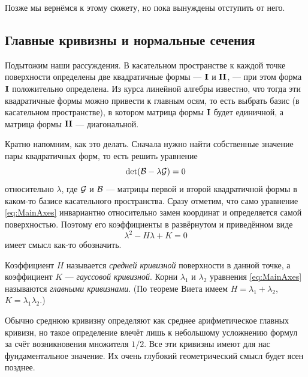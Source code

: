 \noindent%
Позже мы вернёмся к этому сюжету, но пока вынуждены отступить от него.

\subsection{Главные кривизны и нормальные сечения}

Подытожим наши рассуждения. В касательном пространстве к каждой точке поверхности определены две квадратичные формы --- $\boldsymbol{\operatorname{I}}$ и $\boldsymbol{\operatorname{II}}$, --- при этом форма $\boldsymbol{\operatorname{I}}$ положительно определена. Из курса линейной алгебры известно, что тогда эти квадратичные формы можно привести к главным осям, то есть выбрать базис (в касательном пространстве), в котором матрица формы $\boldsymbol{\operatorname{I}}$ будет единичной, а матрица формы $\boldsymbol{\operatorname{II}}$ --- диагональной.

Кратно напомним, как это делать. Сначала нужно найти собственные значение пары квадратичных форм\footnotemark{}, то есть решить уравнение
\begin{equation} \label{eq:MainAxes}
	\det(\mathcal{B} - \lambda\mathcal{G}) = 0
\end{equation}
относительно $\lambda$, где $\mathcal{G}$ и $\mathcal{B}$ --- матрицы первой и второй квадратичной формы в каком-то базисе касательного пространства. Сразу отметим, что само уравнение \eqref{eq:MainAxes} инвариантно относительно замен координат и определяется самой поверхностью. Поэтому его коэффициенты в развёрнутом и приведённом виде
\[
	\lambda^2 -H\lambda + K = 0
\]
имеет смысл как-то обозначить.


\begin{definition}
	Коэффициент $H$ называется \textit{средней кривизной} поверхности в данной точке\footnotemark, а коэффициент $K$ --- \textit{гауссовой кривизной}. Корни $\lambda_1$ и $\lambda_2$ уравнения \eqref{eq:MainAxes} называются \textit{главными кривизнами}. (По теореме Виета имеем $H = \lambda_1 + \lambda_2$, $K = \lambda_1\lambda_2$.)
\end{definition}


Обычно среднюю кривизну определяют как среднее арифметическое главных кривизн, но такое определение влечёт лишь к небольшому усложнению формул за счёт возникновения множителя $1 / 2$. Все эти кривизны имеют для нас фундаментальное значение. Их очень глубокий геометрический смысл будет ясен позднее.

